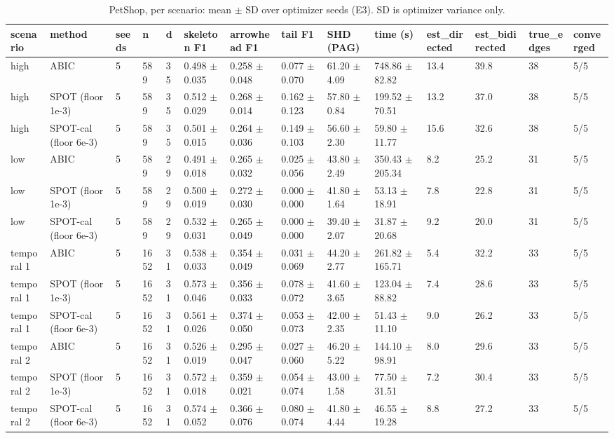 \begin{table}[t]
\centering\footnotesize
\caption{PetShop, per scenario: mean $\pm$ SD over optimizer seeds (E3). SD is optimizer variance only.}\label{tab:T2_petshop_per_scenario}
\begin{tabular}{@{}llllllllllllll@{}}
\toprule
scenario & method & seeds & n & d & skeleton F1 & arrowhead F1 & tail F1 & SHD (PAG) & time (s) & est\_directed & est\_bidirected & true\_edges & converged\\
\midrule
high & ABIC & 5 & 589 & 35 & 0.498 $\pm$ 0.035 & 0.258 $\pm$ 0.048 & 0.077 $\pm$ 0.070 & 61.20 $\pm$ 4.09 & 748.86 $\pm$ 82.82 & 13.4 & 39.8 & 38 & 5/5\\
high & SPOT (floor 1e-3) & 5 & 589 & 35 & 0.512 $\pm$ 0.029 & 0.268 $\pm$ 0.014 & 0.162 $\pm$ 0.123 & 57.80 $\pm$ 0.84 & 199.52 $\pm$ 70.51 & 13.2 & 37.0 & 38 & 5/5\\
high & SPOT-cal (floor 6e-3) & 5 & 589 & 35 & 0.501 $\pm$ 0.015 & 0.264 $\pm$ 0.036 & 0.149 $\pm$ 0.103 & 56.60 $\pm$ 2.30 & 59.80 $\pm$ 11.77 & 15.6 & 32.6 & 38 & 5/5\\
low & ABIC & 5 & 589 & 29 & 0.491 $\pm$ 0.018 & 0.265 $\pm$ 0.032 & 0.025 $\pm$ 0.056 & 43.80 $\pm$ 2.49 & 350.43 $\pm$ 205.34 & 8.2 & 25.2 & 31 & 5/5\\
low & SPOT (floor 1e-3) & 5 & 589 & 29 & 0.500 $\pm$ 0.019 & 0.272 $\pm$ 0.030 & 0.000 $\pm$ 0.000 & 41.80 $\pm$ 1.64 & 53.13 $\pm$ 18.91 & 7.8 & 22.8 & 31 & 5/5\\
low & SPOT-cal (floor 6e-3) & 5 & 589 & 29 & 0.532 $\pm$ 0.031 & 0.265 $\pm$ 0.049 & 0.000 $\pm$ 0.000 & 39.40 $\pm$ 2.07 & 31.87 $\pm$ 20.68 & 9.2 & 20.0 & 31 & 5/5\\
temporal 1 & ABIC & 5 & 1652 & 31 & 0.538 $\pm$ 0.033 & 0.354 $\pm$ 0.049 & 0.031 $\pm$ 0.069 & 44.20 $\pm$ 2.77 & 261.82 $\pm$ 165.71 & 5.4 & 32.2 & 33 & 5/5\\
temporal 1 & SPOT (floor 1e-3) & 5 & 1652 & 31 & 0.573 $\pm$ 0.046 & 0.356 $\pm$ 0.033 & 0.078 $\pm$ 0.072 & 41.60 $\pm$ 3.65 & 123.04 $\pm$ 88.82 & 7.4 & 28.6 & 33 & 5/5\\
temporal 1 & SPOT-cal (floor 6e-3) & 5 & 1652 & 31 & 0.561 $\pm$ 0.026 & 0.374 $\pm$ 0.050 & 0.053 $\pm$ 0.073 & 42.00 $\pm$ 2.35 & 51.43 $\pm$ 11.10 & 9.0 & 26.2 & 33 & 5/5\\
temporal 2 & ABIC & 5 & 1652 & 31 & 0.526 $\pm$ 0.019 & 0.295 $\pm$ 0.047 & 0.027 $\pm$ 0.060 & 46.20 $\pm$ 5.22 & 144.10 $\pm$ 98.91 & 8.0 & 29.6 & 33 & 5/5\\
temporal 2 & SPOT (floor 1e-3) & 5 & 1652 & 31 & 0.572 $\pm$ 0.018 & 0.359 $\pm$ 0.021 & 0.054 $\pm$ 0.074 & 43.00 $\pm$ 1.58 & 77.50 $\pm$ 31.51 & 7.2 & 30.4 & 33 & 5/5\\
temporal 2 & SPOT-cal (floor 6e-3) & 5 & 1652 & 31 & 0.574 $\pm$ 0.052 & 0.366 $\pm$ 0.076 & 0.080 $\pm$ 0.074 & 41.80 $\pm$ 4.44 & 46.55 $\pm$ 19.28 & 8.8 & 27.2 & 33 & 5/5\\
\bottomrule
\end{tabular}
\end{table}
